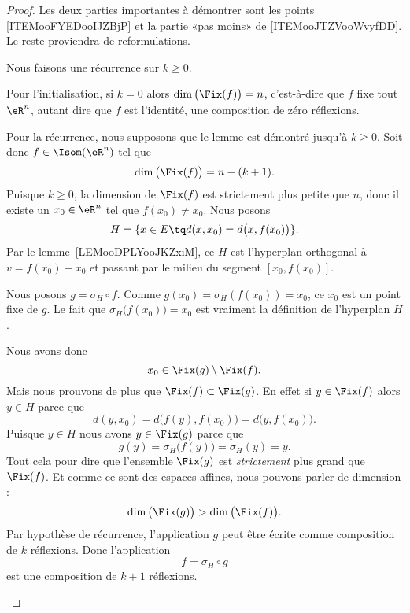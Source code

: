\begin{proof}
	Les deux parties importantes à démontrer sont les points \ref{ITEMooFYEDooIJZBjP} et la partie «pas moins» de \ref{ITEMooJTZVooWvyfDD}. Le reste proviendra de reformulations.
	\begin{subproof}
		Nous faisons une récurrence sur \( k\geq 0\).

		Pour l'initialisation, si \( k=0\) alors \( \dim\big( \Fix(f) \big)=n\), c'est-à-dire que \( f\) fixe tout \( \eR^n\), autant dire que \( f\) est l'identité, une composition de zéro réflexions.

		Pour la récurrence, nous supposons que le lemme est démontré jusqu'à \( k\geq 0\). Soit donc \( f\in\Isom(\eR^n)\) tel que
		\begin{equation}
			\dim\big( \Fix(f) \big)=n-(k+1).
		\end{equation}
		Puisque \( k\geq 0\), la dimension de \( \Fix(f)\) est strictement plus petite que \( n\), donc il existe un \( x_0\in \eR^n\) tel que \( f(x_0)\neq x_0\). Nous posons
		\begin{equation}
			H=\{ x\in E\tq d(x,x_0)=d\big( x,f(x_0) \big)  \}.
		\end{equation}
		Par le lemme~\ref{LEMooDPLYooJKZxiM}, ce \( H\) est l'hyperplan orthogonal à \( v=f(x_0)-x_0\) et passant par le milieu du segment \( [x_0,f(x_0)]\).

		Nous posons \( g=\sigma_H\circ f\). Comme \( g(x_0)=\sigma_H(f(x_0))=x_0\), ce \( x_0\) est un point fixe de \( g\). Le fait que \( \sigma_H\big( f(x_0) \big)=x_0\) est vraiment la définition de l'hyperplan \( H\).

		Nous avons donc
		\begin{equation}
			x_0\in\Fix(g)\setminus\Fix(f).
		\end{equation}
		Mais nous prouvons de plus que \( \Fix(f)\subset\Fix(g)\). En effet si \( y\in \Fix(f)\) alors \( y\in H\) parce que
		\begin{equation}
			d(y,x_0)=d\big( f(y),f(x_0) \big)=d\big( y, f(x_0) \big).
		\end{equation}
		Puisque \( y\in H\) nous avons \( y\in \Fix(g)\) parce que
		\begin{equation}
			g(y)=\sigma_H\big( f(y) \big)=\sigma_H(y)=y.
		\end{equation}
		Tout cela pour dire que l'ensemble \( \Fix(g)\) est \emph{strictement} plus grand que \( \Fix(f)\). Et comme ce sont des espaces affines, nous pouvons parler de dimension :
		\begin{equation}
			\dim\big( \Fix(g) \big)>\dim\big( \Fix(f) \big).
		\end{equation}
		Par hypothèse de récurrence, l'application \(  g\) peut être écrite comme composition de \( k\) réflexions. Donc l'application
		\begin{equation}
			f=\sigma_H\circ g
		\end{equation}
		est une composition de \( k+1\) réflexions.


\end{subproof}
\end{proof}
